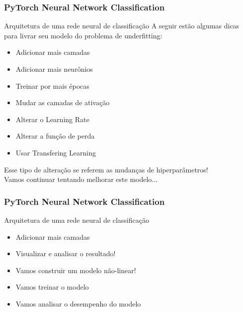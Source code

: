 \documentclass{beamer}
\begin{document}
\begin{frame}
	\frametitle{PyTorch Neural Network Classification}
	\begin{block}{Arquitetura de uma rede neural de classificação}
		A seguir estão algumas dicas para livrar seu modelo do problema de underfitting:
		\begin{itemize}
			\item Adicionar mais camadas
			\item Adicionar mais neurônios 
			\item Treinar por mais épocas
			\item Mudar as camadas de ativação
			\item Alterar o Learning Rate
			\item Alterar a função de perda
			\item Usar Transfering Learning
		\end{itemize}
	Esse tipo de alteração se referem as mudanças de hiperparâmetros! \\
	Vamos continuar tentando melhorar este modelo...
	\end{block}
\end{frame}
\begin{frame}
	\frametitle{PyTorch Neural Network Classification}
	\begin{block}{Arquitetura de uma rede neural de classificação}
		\begin{itemize}
			\item Adicionar mais camadas
			\item Visualizar e analisar o resultado!
			\item Vamos construir um modelo não-linear!
			\item Vamos treinar o modelo
			\item Vamos analisar o desempenho do modelo
		\end{itemize}
	\end{block}
\end{frame}
\end{document}
